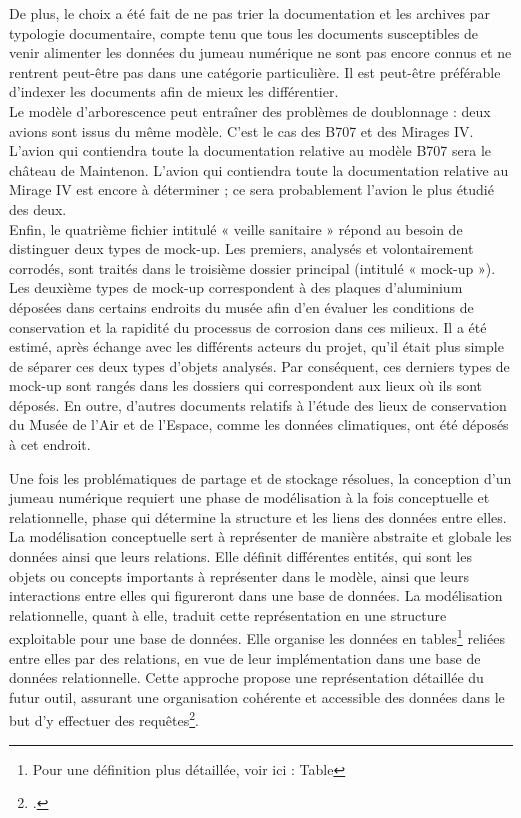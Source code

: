 De plus, le choix a été fait de ne pas trier la documentation et les archives par typologie documentaire, compte tenu que tous les documents susceptibles de venir alimenter les données du jumeau numérique ne sont pas encore connus et ne rentrent peut-être pas dans une catégorie particulière. Il est peut-être préférable d’indexer les documents afin de mieux les différentier.\\

Le modèle d’arborescence peut entraîner des problèmes de doublonnage : deux avions sont issus du même modèle. C’est le cas des B707 et des Mirages IV. L’avion qui contiendra toute la documentation relative au modèle B707 sera le château de Maintenon. L’avion qui contiendra toute la documentation relative au Mirage IV est encore à déterminer ; ce sera probablement l’avion le plus étudié des deux.\\

Enfin, le quatrième fichier intitulé « veille sanitaire » répond au besoin de distinguer deux types de mock-up. Les premiers, analysés et volontairement corrodés, sont traités dans le troisième dossier principal (intitulé « mock-up »). Les deuxième types de mock-up correspondent à des plaques d’aluminium déposées dans certains endroits du musée afin d’en évaluer les conditions de conservation et la rapidité du processus de corrosion dans ces milieux. Il a été estimé, après échange avec les différents acteurs du projet, qu’il était plus simple de séparer ces deux types d’objets analysés. Par conséquent, ces derniers types de mock-up sont rangés dans les dossiers qui correspondent aux lieux où ils sont déposés. En outre, d'autres documents relatifs à l’étude des lieux de conservation du Musée de l'Air et de l'Espace, comme les données climatiques, ont été déposés à cet endroit.\\ 

    
Une fois les problématiques de partage et de stockage résolues, la conception d’un jumeau numérique requiert une phase de modélisation à la fois conceptuelle et relationnelle, phase qui détermine la structure et les liens des données entre elles. La modélisation conceptuelle sert à représenter de manière abstraite et globale les données ainsi que leurs relations. Elle définit différentes entités, qui sont les objets ou concepts importants à représenter dans le modèle, ainsi que leurs interactions entre elles qui figureront dans une base de données. La modélisation relationnelle, quant à elle, traduit cette représentation en une structure exploitable pour une base de données. Elle organise les données en tables\footnote{Pour une définition plus détaillée, voir ici : \gls{Table}} reliées entre elles par des relations, en vue de leur implémentation dans une base de données relationnelle. Cette approche propose une représentation détaillée du futur outil, assurant une organisation cohérente et accessible des données dans le but d’y effectuer des requêtes\footcite{kreuzerArtificialIntelligenceDigital2024}.

